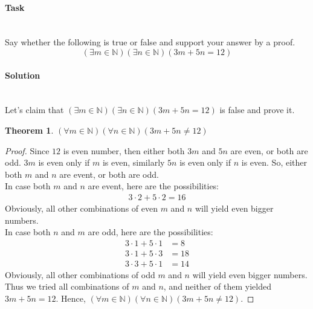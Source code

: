 \documentclass[11pt]{article}
\begin{document}
   \paragraph{Task}\mbox{} \\
   Say whether the following is true or false and support your answer by a proof.
   \begin{equation*}
      \left( \exists m \in \mathbb{N} \right) \left( \exists n \in \mathbb{N} \right) \left( 3m + 5n = 12 \right)
   \end{equation*}
   \paragraph{Solution}\mbox{} \\
   Let's claim that $\left( \exists m \in \mathbb{N} \right) \left( \exists n \in \mathbb{N} \right) \left( 3m + 5n = 12 \right)$ is false and prove it.
   \newtheorem*{Theorem}{Theorem}
   \begin{Theorem}
       $\left( \forall m \in \mathbb{N} \right) \left( \forall n \in \mathbb{N} \right) \left( 3m + 5n \neq 12 \right)$
   \end{Theorem}
   \begin{proof}
   Since $12$ is even number, then either both $3m$ and $5n$ are even, or both are odd.
   $3m$ is even only if $m$ is even, similarly $5n$ is even only if $n$ is even.
   So, either both $m$ and $n$ are event, or both are odd. \\
   In case both $m$    and $n$ are event, here are the possibilities:
   \begin{align*}
      3 \cdot 2 + 5 \cdot 2 = 16
   \end{align*}
   Obviously, all other combinations of even $m$ and $n$ will yield even bigger numbers. \\
   In case both $n$    and $m$ are odd, here are the possibilities:
   \begin{align*}
      3 \cdot 1 + 5 \cdot 1 &= 8 \\
      3 \cdot 1 + 5 \cdot 3 &= 18 \\
      3 \cdot 3 + 5 \cdot 1 &= 14
   \end{align*}
   Obviously, all other combinations of odd $m$ and $n$ will yield even bigger numbers. \\
   Thus we tried all combinations of $m$ and $n$, and neither of them yielded $3m + 5n = 12$.
   Hence, $\left( \forall m \in \mathbb{N} \right) \left( \forall n \in \mathbb{N} \right) \left( 3m + 5n \neq 12 \right)$.
   \end{proof}
\end{document}
